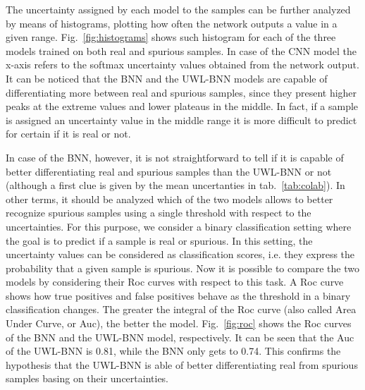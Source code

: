 \documentclass[11pt,twoside,a4paper]{article}
\begin{document}
The uncertainty assigned by each model to the samples can be further analyzed by means of histograms, plotting how often the network outputs a value in a given range. Fig.~\ref{fig:histograms} shows such histogram for each of the three models trained on both real and spurious samples. In case of the CNN model the x-axis refers to the softmax uncertainty values obtained from the network output. It can be noticed that the BNN and the UWL-BNN models are capable of differentiating more between real and spurious samples, since they present higher peaks at the extreme values and lower plateaus in the middle. In fact, if a sample is assigned an uncertainty value in the middle range it is more difficult to predict for certain if it is real or not.

In case of the BNN, however, it is not straightforward to tell if it is capable of better differentiating real and spurious samples than the UWL-BNN or not (although a first clue is given by the mean uncertanties in tab.~\ref{tab:colab}). In other terms, it should be analyzed which of the two models allows to better recognize spurious samples using a single threshold with respect to the uncertainties.\newline
For this purpose, we consider a binary classification setting where the goal is to predict if a sample is real or spurious. In this setting, the uncertainty values can be considered as classification scores, i.e. they express the probability that a given sample is spurious. Now it is possible to compare the two models by considering their Roc curves with respect to this task. A Roc curve shows how true positives and false positives behave as the threshold in a binary classification changes. The greater the integral of the Roc curve (also called Area Under Curve, or Auc), the better the model.\newline
Fig.~\ref{fig:roc} shows the Roc curves of the BNN and the UWL-BNN model, respectively. It can be seen that the Auc of the UWL-BNN is 0.81, while the BNN only gets to 0.74. This confirms the hypothesis that the UWL-BNN is able of better differentiating real from spurious samples basing on their uncertainties.
\end{document}
